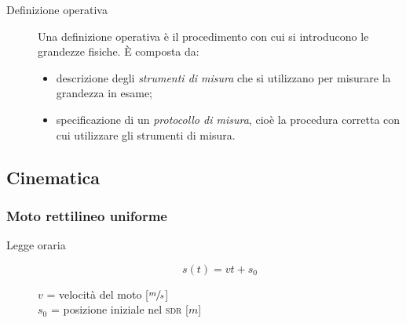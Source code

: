 \documentclass[a4paper,11pt,italian]{article}
\begin{document}
\begin{description}
  \item[Definizione operativa] 
  Una definizione operativa è il procedimento con cui si introducono le grandezze fisiche. È composta da:
  \begin{itemize}
    \item descrizione degli \emph{strumenti di misura} che si utilizzano per misurare la grandezza in esame; 
    \item specificazione di un \emph{protocollo di misura}, cioè la procedura corretta con cui utilizzare gli strumenti di misura.
  \end{itemize}
\end{description}



\subsection{Cinematica}\label{sec:cinematica}
\subsubsection{Moto rettilineo uniforme}
\begin{description}
  \item[Legge oraria] 
  \[ s(t) = v  t + s_0 \]
  \begin{multicols}{2}
  $ v $ = velocità del moto [$ \sfrac{m}{s} $]\\
  $ s_0 $ = posizione iniziale nel \textsc{sdr} [$ m $]
  \end{multicols}
\end{description}
\end{document}
